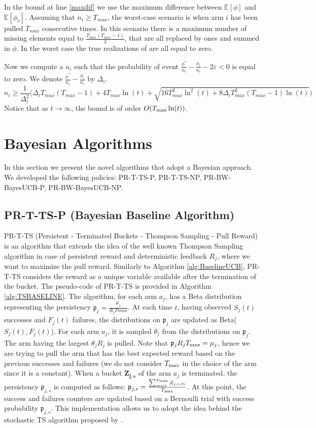 In the bound at line \ref{maxdif} we use the maximum difference between $\mathbb{E}[\phi]$ and $\mathbb{E}[\phi_v]$. Assuming that $n_i \ge T_{max}$, the worst-case scenario is when arm $i$ has been pulled $T_{max}$ consecutive times. In this scenario there is a maximum number of missing elements equal to $\frac{T_{max}(T_{max}-1)}{2}$, that are all replaced by ones and summed in $\phi$. In the worst case the true realizations of are all equal to zero.

Now we compute a $n_i$ such that the probability of event $\frac{\phi^*}{n_i}-\frac{\phi_i}{n_i}-2\varepsilon <0$ is equal to zero. We denote $\frac{\phi^*}{n_i}-\frac{\phi_i}{n_i}$ by $\Delta_i$.
\[ n_i \ge \frac{1}{\Delta_i^2} \Bigg( \Delta_i T_{max}(T_{max}-1) + 4 T_{max} \ln(t) + \sqrt{16 T_{max}^2 \ln^2(t) + 8 \Delta_i T^2_{max}(T_{max}-1)\ln(t)} \Bigg)
\]
Notice that as $t \rightarrow \infty$, the bound is of order $O(T_{\textnormal{max}}\ln(t))$.




\section{Bayesian Algorithms}
In this section we present the novel algorithms that adopt a Bayesian approach. We developed the following policies: PR-T-TS-P, PR-T-TS-NP, PR-BW-BayesUCB-P, PR-BW-BayesUCB-NP.
\subsection{PR-T-TS-P (Bayesian Baseline Algorithm)}
PR-T-TS (Persistent - Terminated Buckets - Thompson Sampling - Pull Reward) is an algorithm that extends the idea of the well known Thompson Sampling algorithm in case of persistent reward and deterministic feedback $R_j$, where we want to maximize the pull reward. Similarly to Algorithm \ref{alg:BaselineUCB}, PR-T-TS considers the reward as a unique variable available after the termination of the bucket. The pseudo-code of PR-T-TS is provided in Algorithm \ref{alg:TSBASELINE}. The algorithm, for each arm $a_j$, has a Beta distribution representing the persistency $\mathfrak{p}_j=\frac{\mu_j}{R_jTmax}$. At each time $t$, having observed $S_j(t)$ successes and $F_j(t)$ failures, the distributions on $\mathfrak{p}_j$ are updated as Beta($S_j(t),F_j(t)$). For each arm $a_j$, it is sampled $\theta_j$ from the distributions on $\mathfrak{p}_j$. The arm having the largest $\theta_jR_j$  is pulled. Note that $\mathfrak{p}_jR_jT_{\textnormal{max}} = \mu_j$, hence we are trying to pull the arm that has the best expected reward based on the previous successes and failures (we do not consider $T_{\textnormal{max}}$ in the choice of the arm since it is a constant). When a bucket $\boldsymbol{Z_{j,s}}$ of the arm $a_j$ is terminated, the persistency $\mathfrak{p}_{j,s}$ is computed as follows: $\mathfrak{p}_{j,s} = \frac{\sum_{m=1}^{T_{\textnormal{max}}} Z_{j,s,m}}{T_{\textnormal{max}}}$. At this point, the success and failures counters are updated based on a Bernoulli trial with success probability $\mathfrak{p}_{j,s}$. This implementation allows us to adopt the idea behind the stochastic TS algorithm proposed by \cite{agrawal2012analysis}.

